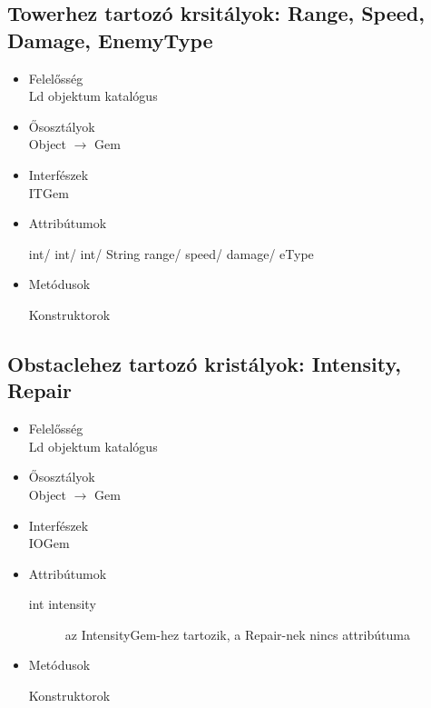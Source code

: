 \subsection{Towerhez tartozó krsitályok: Range, Speed, Damage, EnemyType}
\begin{itemize}
\item Felelősség\\
Ld objektum katalógus
\item Ősosztályok\\
Object $\rightarrow$ Gem
\item Interfészek\\
ITGem
\item Attribútumok\\
	\begin{description}
		\item[int/ int/ int/ String range/ speed/ damage/ eType] 
		
	\end{description}
\item Metódusok\\
	\begin{description}
		\item[Konstruktorok]
		
	\end{description}
\end{itemize}
\subsection{Obstaclehez tartozó kristályok: Intensity, Repair}
\begin{itemize}
\item Felelősség\\
Ld objektum katalógus
\item Ősosztályok\\
Object $\rightarrow$ Gem
\item Interfészek\\
IOGem

\item Attribútumok\\
	\begin{description}
		\item[int intensity] az IntensityGem-hez tartozik, a Repair-nek nincs attribútuma
		
	\end{description}
\item Metódusok\\
	\begin{description}
		\item[Konstruktorok]
		
	\end{description}
\end{itemize}
